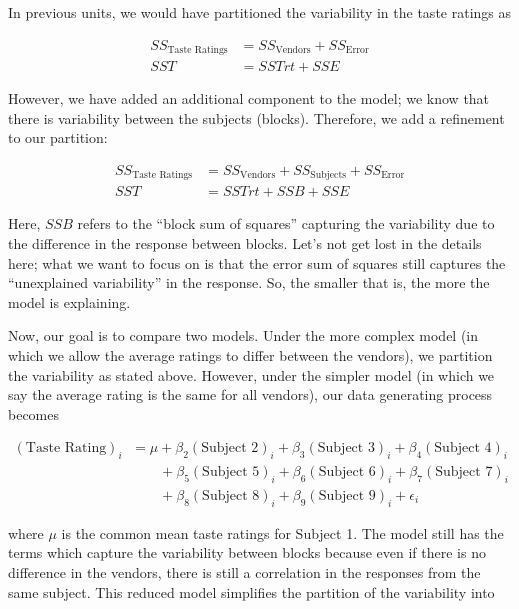 \documentclass[]{book}
\theoremstyle{plain}
\theoremstyle{mydefn}
\theoremstyle{myexmpl}
\theoremstyle{remark}
\begin{document}
In previous units, we would have partitioned the variability in the
taste ratings as

\[
\begin{aligned}
  SS_{\text{Taste Ratings}} &= SS_{\text{Vendors}} + SS_{\text{Error}} \\
  SST &= SSTrt + SSE
\end{aligned}
\]

However, we have added an additional component to the model; we know
that there is variability between the subjects (blocks). Therefore, we
add a refinement to our partition:

\[
\begin{aligned}
  SS_{\text{Taste Ratings}} &= SS_{\text{Vendors}} + SS_{\text{Subjects}} + SS_{\text{Error}} \\
  SST &= SSTrt + SSB + SSE
\end{aligned}
\]

Here, \(SSB\) refers to the ``block sum of squares'' capturing the
variability due to the difference in the response between blocks. Let's
not get lost in the details here; what we want to focus on is that the
error sum of squares still captures the ``unexplained variability'' in
the response. So, the smaller that is, the more the model is explaining.

Now, our goal is to compare two models. Under the more complex model (in
which we allow the average ratings to differ between the vendors), we
partition the variability as stated above. However, under the simpler
model (in which we say the average rating is the same for all vendors),
our data generating process becomes

\[
\begin{aligned}
  (\text{Taste Rating})_i &= \mu + \beta_2 (\text{Subject 2})_i + \beta_3 (\text{Subject 3})_i + \beta_4 (\text{Subject 4})_i \\
    &\qquad + \beta_5 (\text{Subject 5})_i + \beta_6 (\text{Subject 6})_i + \beta_7 (\text{Subject 7})_i \\
    &\qquad + \beta_8 (\text{Subject 8})_i + \beta_9 (\text{Subject 9})_i + \epsilon_i
\end{aligned}
\]

where \(\mu\) is the common mean taste ratings for Subject 1. The model
still has the terms which capture the variability between blocks because
even if there is no difference in the vendors, there is still a
correlation in the responses from the same subject. This reduced model
simplifies the partition of the variability into
\end{document}
